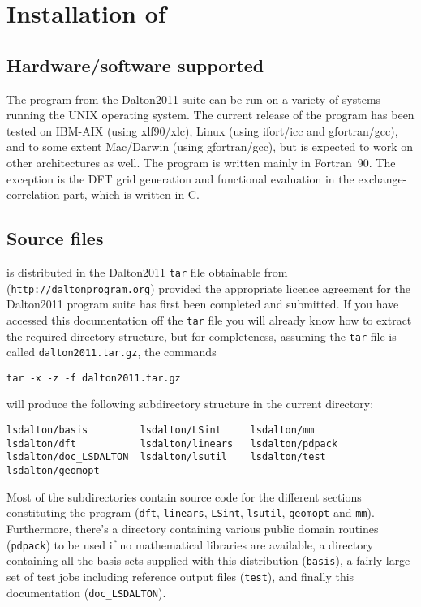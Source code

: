 \chapter{Installation of \lsdalton}\label{ch:install}

\section{Hardware/software
supported}\label{sec:hardsoft}

The {\lsdalton} program from the Dalton2011 suite
can be run on a variety of systems running the UNIX
operating system. The current release of the program 
has been tested on 
IBM-AIX (using xlf90/xlc),
Linux (using ifort/icc and gfortran/gcc), 
and to some extent Mac/Darwin (using gfortran/gcc), but is
expected to work on other architectures as well. 
The program is written mainly in Fortran~90.
The exception is the DFT grid generation and functional evaluation in the 
exchange-correlation part, which is written in C.

\section{Source files}\label{sec:source}

{\lsdalton} is distributed in the Dalton2011 \verb|tar| file obtainable from
(\verb|http://daltonprogram.org|) provided the appropriate
licence agreement for the Dalton2011 program suite has first been
completed and submitted.
If you have accessed this documentation off the
\verb|tar| file you will
already know how to extract the required directory structure, but
for completeness, assuming the \verb|tar| file is called
\verb|dalton2011.tar.gz|, the commands
\begin{verbatim}
tar -x -z -f dalton2011.tar.gz
\end{verbatim}
will produce the following subdirectory structure in the current
directory:
\begin{verbatim}
lsdalton/basis         lsdalton/LSint     lsdalton/mm
lsdalton/dft           lsdalton/linears   lsdalton/pdpack               
lsdalton/doc_LSDALTON  lsdalton/lsutil    lsdalton/test            
lsdalton/geomopt
\end{verbatim}
Most of the subdirectories contain source code for the different sections
constituting the {\lsdalton} program (\verb|dft|, \verb|linears|, 
\verb|LSint|, \verb|lsutil|, \verb|geomopt| and \verb|mm|). Furthermore,
there's a directory containing
various public domain routines (\verb|pdpack|) to be used if no 
mathematical libraries are available, a directory containing
all the basis sets supplied with this distribution (\verb|basis|), a
fairly large set of test jobs including reference output files
(\verb|test|), and finally this documentation (\verb|doc_LSDALTON|). 

